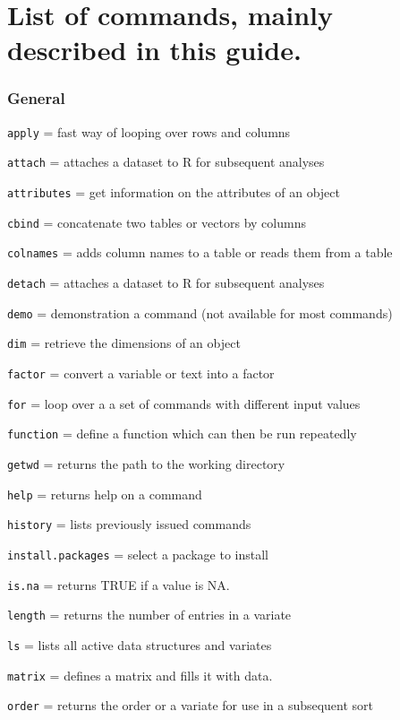 \documentclass[
]{book}
\begin{document}
\hypertarget{list-of-commands-mainly-described-in-this-guide.}{%
\section{List of commands, mainly described in this guide.}\label{list-of-commands-mainly-described-in-this-guide.}}

\hypertarget{general}{%
\subsubsection{General}\label{general}}

\texttt{apply} = fast way of looping over rows and columns

\texttt{attach} = attaches a dataset to R for subsequent analyses

\texttt{attributes} = get information on the attributes of an object

\texttt{cbind} = concatenate two tables or vectors by columns

\texttt{colnames} = adds column names to a table or reads them from a table

\texttt{detach} = attaches a dataset to R for subsequent analyses

\texttt{demo} = demonstration a command (not available for most commands)

\texttt{dim} = retrieve the dimensions of an object

\texttt{factor} = convert a variable or text into a factor

\texttt{for} = loop over a a set of commands with different input values

\texttt{function} = define a function which can then be run repeatedly

\texttt{getwd} = returns the path to the working directory

\texttt{help} = returns help on a command

\texttt{history} = lists previously issued commands

\texttt{install.packages} = select a package to install

\texttt{is.na} = returns TRUE if a value is NA.

\texttt{length} = returns the number of entries in a variate

\texttt{ls} = lists all active data structures and variates

\texttt{matrix} = defines a matrix and fills it with data.

\texttt{order} = returns the order or a variate for use in a subsequent sort
\end{document}
